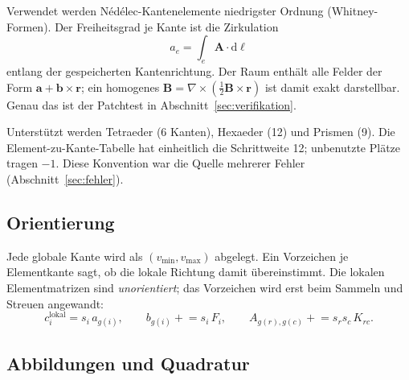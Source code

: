 \documentclass[11pt,a4paper]{article}
\begin{document}
Verwendet werden Nédélec-Kantenelemente niedrigster Ordnung (Whitney-Formen).
Der Freiheitsgrad je Kante ist die Zirkulation
\begin{equation}
  a_e = \int_e \mathbf{A}\cdot\mathrm{d}\boldsymbol{\ell}
\end{equation}
entlang der gespeicherten Kantenrichtung. Der Raum enthält alle Felder der
Form $\mathbf{a} + \mathbf{b}\times\mathbf{r}$; ein homogenes
$\mathbf{B} = \nabla\times(\tfrac12\mathbf{B}\times\mathbf{r})$ ist damit
exakt darstellbar. Genau das ist der Patchtest in
Abschnitt~\ref{sec:verifikation}.

Unterstützt werden Tetraeder (6 Kanten), Hexaeder (12) und Prismen (9). Die
Element-zu-Kante-Tabelle hat einheitlich die Schrittweite 12; unbenutzte
Plätze tragen $-1$. Diese Konvention war die Quelle mehrerer Fehler
(Abschnitt~\ref{sec:fehler}).

\subsection{Orientierung}

Jede globale Kante wird als $(v_{\min}, v_{\max})$ abgelegt. Ein
Vorzeichen je Elementkante sagt, ob die lokale Richtung damit übereinstimmt.
Die lokalen Element\-matrizen sind \emph{unorientiert}; das Vorzeichen wird
erst beim Sammeln und Streuen angewandt:
\begin{equation}
  c_i^{\text{lokal}} = s_i\, a_{g(i)},
  \qquad
  b_{g(i)} \mathrel{+}= s_i\, F_i,
  \qquad
  A_{g(r),g(c)} \mathrel{+}= s_r s_c\, K_{rc}.
\end{equation}

\subsection{Abbildungen und Quadratur}
\end{document}
